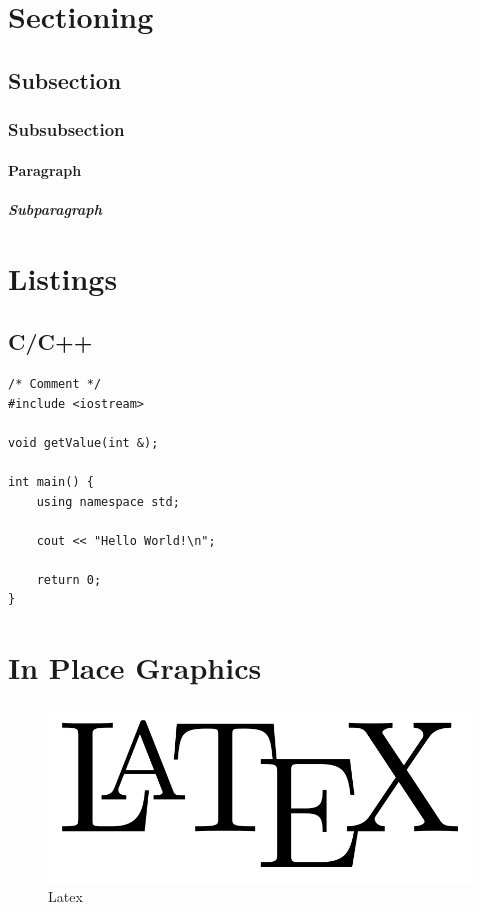 \documentclass{swddoc}
\begin{document}
\tableofcontents

\section{Sectioning}
\subsection{Subsection}
\subsubsection{Subsubsection}
\paragraph{Paragraph}
\subparagraph{Subparagraph}

\section{Listings}

\subsection{C/C++}

\begin{lstlisting}[style=swd_cpp_lst_style]
/* Comment */
#include <iostream>

void getValue(int &);

int main() {
	using namespace std;

	cout << "Hello World!\n";
	
	return 0;
}
\end{lstlisting}

\section{In Place Graphics}
\begin{figure}[H]
\includegraphics[scale=0.3]{img/LaTeX-logo.png} 
\centering
\caption{Latex}
\end{figure}
\end{document}
